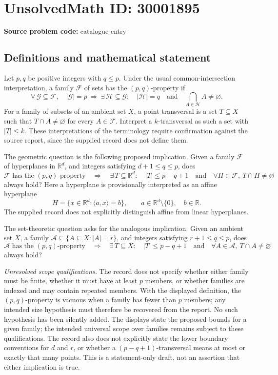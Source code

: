 \documentclass[11pt]{article}
\newcommand{\R}{\mathbb{R}}
\begin{document}
\section*{UnsolvedMath ID: 30001895}
\textbf{Source problem code:} catalogue entry
\subsection{Definitions and mathematical statement}
Let \(p,q\) be positive integers with \(q\le p\). Under the usual common-intersection interpretation, a family \(\mathcal F\) of sets has the \((p,q)\)-property if
\[
\forall\,\mathcal G\subseteq\mathcal F,\quad
|\mathcal G|=p\ \Longrightarrow\
\exists\,\mathcal H\subseteq\mathcal G:\quad
|\mathcal H|=q\quad\text{and}\quad
\bigcap_{A\in\mathcal H}A\ne\varnothing.
\]
For a family of subsets of an ambient set \(X\), a point transversal is a set \(T\subseteq X\) such that \(T\cap A\ne\varnothing\) for every \(A\in\mathcal F\). Interpret a \(k\)-transversal as such a set with \(|T|\le k\). These interpretations of the terminology require confirmation against the source report, since the supplied record does not define them.

The geometric question is the following proposed implication. Given a family \(\mathcal F\) of hyperplanes in \(\R^d\), and integers satisfying \(d+1\le q\le p\), does
\[
\mathcal F\text{ has the }(p,q)\text{-property}
\quad\Longrightarrow\quad
\exists\,T\subseteq\R^d:\quad
|T|\le p-q+1\quad\text{and}\quad
\forall H\in\mathcal F,\ T\cap H\ne\varnothing
\]
always hold? Here a hyperplane is provisionally interpreted as an affine hyperplane
\[
H=\{x\in\R^d:\langle a,x\rangle=b\},
\qquad a\in\R^d\setminus\{0\},\quad b\in\R.
\]
The supplied record does not explicitly distinguish affine from linear hyperplanes.

The set-theoretic question asks for the analogous implication. Given an ambient set \(X\), a family \(\mathcal A\subseteq\{A\subseteq X:|A|=r\}\), and integers satisfying \(r+1\le q\le p\), does
\[
\mathcal A\text{ has the }(p,q)\text{-property}
\quad\Longrightarrow\quad
\exists\,T\subseteq X:\quad
|T|\le p-q+1\quad\text{and}\quad
\forall A\in\mathcal A,\ T\cap A\ne\varnothing
\]
always hold?

\emph{Unresolved scope qualifications.} The record does not specify whether either family must be finite, whether it must have at least \(p\) members, or whether families are indexed and may contain repeated members. With the displayed definition, the \((p,q)\)-property is vacuous when a family has fewer than \(p\) members; any intended size hypothesis must therefore be recovered from the report. No such hypothesis has been silently added. The displays state the proposed bounds for a given family; the intended universal scope over families remains subject to these qualifications. The record also does not explicitly state the lower boundary conventions for \(d\) and \(r\), or whether a \((p-q+1)\)-transversal means at most or exactly that many points. This is a statement-only draft, not an assertion that either implication is true.
\end{document}
